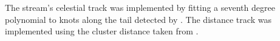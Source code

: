 The stream's celestial track was implemented by fitting a seventh degree polynomial to knots along the tail detected by \citet[][data provided by A. Sollima in priv. comm]{Sollima2020}. The distance track was implemented using the cluster distance taken from \citet{Harris1996}.
